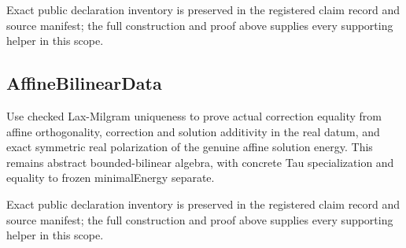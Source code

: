 \documentclass[11pt]{article}
\theoremstyle{definition}
\theoremstyle{remark}
\numberwithin{equation}{section}
\begin{document}
Exact public declaration inventory is preserved in the registered claim record and source manifest; the full construction and proof above supplies every supporting helper in this scope.

\subsection{AffineBilinearData}
\label{daytime-v010:affinebilineardata}
Use checked Lax-Milgram uniqueness to prove actual correction equality from affine orthogonality, correction and solution additivity in the real datum, and exact symmetric real polarization of the genuine affine solution energy. This remains abstract bounded-bilinear algebra, with concrete Tau specialization and equality to frozen minimalEnergy separate.

Exact public declaration inventory is preserved in the registered claim record and source manifest; the full construction and proof above supplies every supporting helper in this scope.
\end{document}
